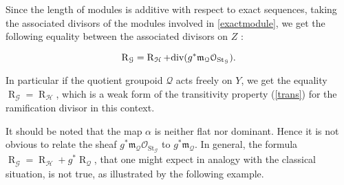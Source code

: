 \documentclass{amsart}
\theoremstyle{definition}
\theoremstyle{remark}
\begin{document}
Since the length of modules is additive with respect to exact sequences, taking the associated divisors of the modules involved in \ref{exactmodule}, we get the following equality between the associated divisors on $Z$ : 

\[ \operatorname{R}_{{\mathcal G}} = \operatorname{R}_{{\mathcal H}} + \textup{div}(g^*{{\mathfrak m}}_{{\mathcal Q}} {{\mathcal O}}_{\operatorname{St}_{{\mathcal G}}}). \]

\label{transtriv} In particular if the quotient groupoid ${{\mathcal Q}}$ acts freely on $Y$, we get the equality $\operatorname{R}_{{\mathcal G}} = \operatorname{R}_{{\mathcal H}}$, which is a weak form of the transitivity property (\ref{trans}) for the ramification divisor in this context. 

It should be noted that the map $\alpha$ is neither flat nor dominant. Hence it is not obvious to relate the sheaf $ g^*{{\mathfrak m}}_{{\mathcal Q}} {{\mathcal O}}_{\operatorname{St}_{{\mathcal G}}}$ to $g^*{{\mathfrak m}}_{{\mathcal Q}}$. In general, the formula $\operatorname{R}_{{\mathcal G}} = \operatorname{R}_{{\mathcal H}} + g^* \operatorname{R}_{{\mathcal Q}}$, that one might expect in analogy with the classical situation, is not true, as illustrated by the following example. 
\end{document}
